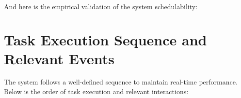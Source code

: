 \documentclass[a4paper,12pt]{article}
\begin{document}
And here is the empirical validation of the system schedulability:

\begin{table}[H]
    \centering
    \caption{Empirical Validation of Task Schedulability}
    \label{tab:schedulability}
\end{table}


\section{Task Execution Sequence and Relevant Events}

The system follows a well-defined sequence to maintain real-time performance. Below is the order of task execution and relevant interactions:
\end{document}
